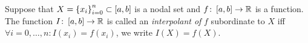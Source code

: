 \begin{frame}
    \begin{definition}
        Suppose that
        \begin{math}
            X={\left\{x_{i}\right\}}_{i=0}^{n}\subset
            \left[a,b\right]
        \end{math}
        is a nodal set and
        \begin{math}
            f\colon
            \left[a,b\right]\to
            \mathbb{R}
        \end{math}
        is a function.
        The function
        \begin{math}
            I\colon
            \left[a,b\right]\to
            \mathbb{R}
        \end{math}
        is called an \emph{interpolant of} $f$ subordinate to $X$ iff
        \begin{math}
            \forall i=0,\dotsc,n:
            I\left(x_{i}\right)=
            f\left(x_{i}\right)
        \end{math},
        we write
        \begin{math}
            I\left(X\right)=
            f\left(X\right)
        \end{math}.
    \end{definition}
\end{frame}

